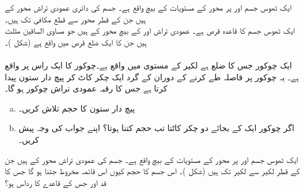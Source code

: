 ایک ٹھوس جسم  اور  پر  محور  کے  مستویات کے بیچ واقع ہے۔ جسم کی دائری عمودی تراش محور  کے  ہیں جن کے قطر محور  سے قطع مکافی  تک ہیں۔\\
\wf{\unexpanded{
$8\pi$
}}
ایک ٹھوس جسم کا قاعدہ قرص  ہے۔ عمودی تراش     اور  کے بیچ محور  کے  ہیں جو مساوی الساقین مثلث ہیں جن کا ایک ضلع قرص میں  واقع ہے (شکل )۔
\\
\\
ایک چوکور جس کا ضلع  ہے لکیر  کے  مستوی میں واقع ہے۔چوکور کا ایک راس  پر واقع ہے۔ یہ چوکور  پر  فاصلہ طے کرنے کے دوران     کے گرد ایک چکر  کاٹ کر پیچ  دار  ستون  پیدا کرتا ہے جس کا رقبہ عمودی تراش چوکور ہو گا۔
\begin{enumerate}[a.]
\item
پیچ دار ستون کا حجم تلاش کریں۔
\item
اگر چوکور ایک کے بجائے دو  چکر کاٹتا تب حجم کتنا ہوتا؟ اپنے جواب کی وجہ پیش کریں۔ 
\end{enumerate} 
ایک ٹھوس جسم  اور  پر  محور  کے  مستویات کے بیچ واقع ہے۔ جسم کی  عمودی تراش محور  کے  ہیں جن کے  قطر لکیر  سے لکیر  تک ہیں (شکل )۔ اس جسم کا حجم کیوں اس قائمہ مخروط جتنا ہو گا جس کا قد  اور جس کے قاعدے  کا رداس  ہو؟ 
